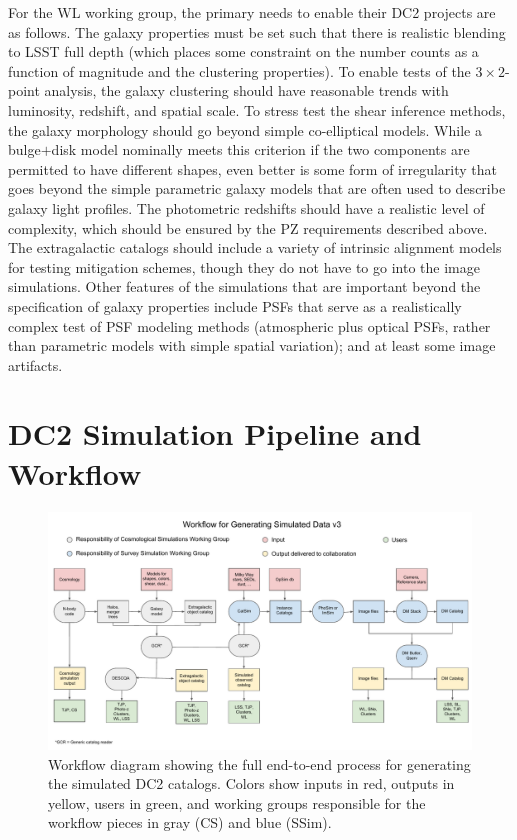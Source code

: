 \documentclass[preprint,times]{aastex61}
\begin{document}
For the WL working group, the primary needs to enable their DC2 projects are as follows.  The galaxy
properties must be set such that there is realistic blending to LSST full depth (which places some
constraint on the number counts as a function of magnitude and the clustering properties).  To
enable tests of the $3\times 2$-point analysis, the galaxy clustering should have reasonable trends
with luminosity, redshift, and spatial scale.  To stress test the shear inference methods, the
galaxy morphology should go beyond simple co-elliptical models.  While a bulge$+$disk model
nominally meets this criterion if the two components are permitted to have different shapes, even
better is some form of irregularity that goes beyond the simple parametric galaxy models that are
often used to describe galaxy light profiles.  The photometric redshifts should have a realistic
level of complexity, which should be ensured by the PZ requirements described above.  The
extragalactic catalogs should include a variety of intrinsic alignment models for testing mitigation
schemes, though they do not have to go into the image simulations.  Other features of the
simulations that are important beyond the specification of galaxy properties include PSFs that serve
as a realistically complex test of PSF modeling methods (atmospheric plus optical PSFs, rather than
parametric models with simple spatial variation); and at least some image artifacts.

\section{DC2 Simulation Pipeline and Workflow}

\begin{figure}[!htb]
\includegraphics[width=1\textwidth]{Catalog_Simulation_Workflow}
\caption{\label{fig:workflow}Workflow diagram showing the full end-to-end process for generating the simulated DC2 catalogs. Colors show inputs in red, outputs in yellow, users in green, and working groups responsible for the workflow pieces in gray (CS) and blue (SSim).}
\end{figure}
\end{document}
